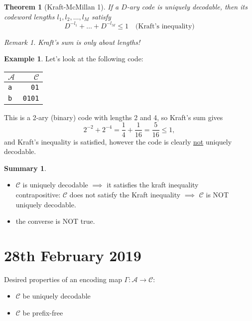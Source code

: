 \documentclass{article}
\theoremstyle{plain}
\newtheorem{thm}{Theorem}
\theoremstyle{definition}
\newtheorem{exmp}{Example}
\newtheorem*{summary}{Summary}
\theoremstyle{remark}
\newtheorem*{remark}{Remark}
\begin{document}
\begin{thm}[Kraft-McMillan 1]
	If a $D$-ary code is uniquely decodable, then its codeword lengths $l_1, l_2, \ldots, l_M$ satisfy
\begin{equation}
	D^{-l_1} + \dots + D^{-l_M} \leq 1 \quad \text{(Kraft's inequality)}
\end{equation}
\begin{remark}
Kraft's sum is only about lengths!
\end{remark}
\end{thm}

\begin{exmp} Let's look at the following code:
\begin{center}
	\begin{tabular}{l | r}
	$\mathcal A$ & $\mathcal C$ \\ \hline
	\texttt a & \texttt{01} \\
	\texttt b & \texttt{0101}	
	\end{tabular}
\end{center}
	This is a 2-ary (binary) code with lengths 2 and 4, so Kraft's sum gives
	\begin{equation*}
		2^{-2} + 2^{-4} = \frac14 + \frac{1}{16} = \frac{5}{16} \leq 1,
	\end{equation*}
	and Kraft's inequality is satisfied, however the code is clearly \ul{not} uniquely decodable.
\end{exmp}


\begin{summary}
\begin{itemize}
	\item $\mathcal C$ is uniquely decodable $\implies$ it satisfies the kraft inequality \\
			contrapositive: $\mathcal C$ does not satisfy the Kraft inequality $\implies$ $\mathcal C$ is NOT uniquely decodable.
	\item the converse is NOT true.
\end{itemize}
\end{summary}

\section{28th February 2019}

Desired properties of an encoding map $\Gamma : \mathcal A \to \mathcal C$:
\begin{itemize}
	\item $\mathcal C$ be uniquely decodable
	\item $\mathcal C$ be prefix-free
\end{itemize}
\end{document}
